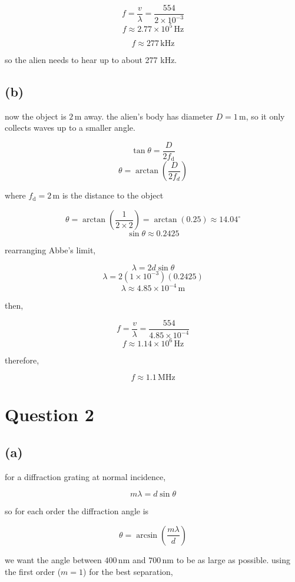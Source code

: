 \documentclass{article}
\begin{document}
\[
f=\frac{v}{\lambda}=\frac{554}{2\times10^{-3}}
\]
\[
f\approx2.77\times10^{5}\,\mathrm{Hz}
\]

\[
\boxed{f\approx277\,\mathrm{kHz}}
\]

so the alien needs to hear up to about 277 kHz.

\subsection*{(b)}

now the object is $2\,\mathrm{m}$ away. the alien's body has diameter $D=1\,\mathrm{m}$, so it only collects waves up to a smaller angle.

\[
\tan\theta=\frac{D}{2f_{\mathrm{d}}}
\]
\[
\theta = \arctan\left(\frac{D}{2f_d}\right)
\]

where $f_{\mathrm{d}}=2\,\mathrm{m}$ is the distance to the object

\[
\theta=\arctan\left(\frac{1}{2\times2}\right)=\arctan(0.25)\approx14.04^\circ
\]
\[
\sin\theta\approx0.2425
\]
 
rearranging Abbe's limit,
 
\[
\lambda=2d\sin\theta
\]
\[
\lambda=2(1\times10^{-3})(0.2425)
\]
\[
\lambda\approx4.85\times10^{-4}\,\mathrm{m}
\]
 
then,
 
\[
f=\frac{v}{\lambda}
=\frac{554}{4.85\times10^{-4}}
\]
\[
f\approx1.14\times10^{6}\,\mathrm{Hz}
\]

therefore, 

\[
\boxed{f\approx1.1\,\mathrm{MHz}}
\]
 
\section*{Question 2}

\subsection*{(a)}

for a diffraction grating at normal incidence,

\[
m\lambda=d\sin\theta
\]

so for each order the diffraction angle is

\[
\theta=\arcsin\left(\frac{m\lambda}{d}\right)
\]
 
we want the angle between $400\,\mathrm{nm}$ and $700\,\mathrm{nm}$ to be as large as possible. using the first order ($m=1$) for the best separation,
\end{document}
